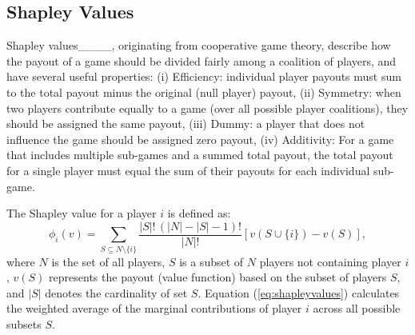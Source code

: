 






\subsection{Shapley Values}

Shapley values____, originating from cooperative game theory, describe how the payout of a game should be divided fairly among a coalition of players, and have several useful properties:
(i) Efficiency: individual player payouts must sum to the total payout minus the original (null player) payout,
(ii) Symmetry: when two players contribute equally to a game (over all possible player coalitions), they should be assigned the same payout,
(iii) Dummy: a player that does not influence the game should be assigned zero payout,
(iv) Additivity: For a game that includes multiple sub-games and a summed total payout, the total payout for a single player must equal the sum of their payouts for each individual sub-game.

The Shapley value for a player \( i \) is defined as:
\begin{equation}
\phi_i(v) = \sum_{S \subseteq N \setminus \{i\}} \frac{|S|! \, (|N| - |S| - 1)!}{|N|!} \left[ v(S \cup \{i\}) - v(S) \right],
\label{eq:shapleyvalues}
\end{equation}
where \( N \) is the set of all players, \( S \) is a subset of \( N \) players not containing player \( i \), \( v(S) \) represents the payout (value function) based on the subset of players \( S \), and \( |S| \) denotes the cardinality of set \( S \). Equation (\ref{eq:shapleyvalues}) calculates the weighted average of the marginal contributions of player \( i \) across all possible subsets \( S \). 

